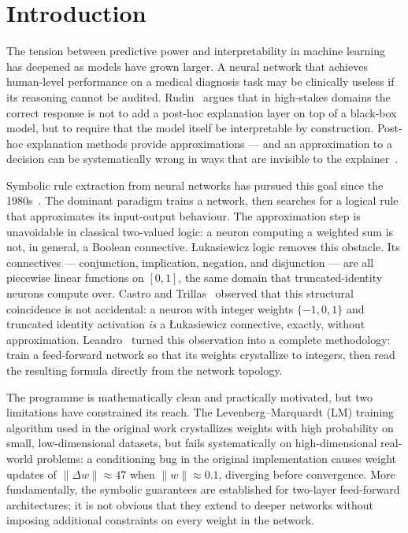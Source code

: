 \documentclass[12pt,a4paper]{article}
\begin{document}
\section{Introduction}
\label{sec:intro}

The tension between predictive power and interpretability in machine learning
has deepened as models have grown larger.
A neural network that achieves human-level performance on a medical diagnosis
task may be clinically useless if its reasoning cannot be audited.
Rudin~\cite{rudin2019} argues that in high-stakes domains the correct response
is not to add a post-hoc explanation layer on top of a black-box model, but to
require that the model itself be interpretable by construction.
Post-hoc explanation methods provide approximations --- and an approximation
to a decision can be systematically wrong in ways that are invisible to the
explainer~\cite{guidotti2018}.

Symbolic rule extraction from neural networks has pursued this goal since the
1980s~\cite{gallant1988,towell1993,towell1994}.
The dominant paradigm trains a network, then searches for a logical rule that
approximates its input-output behaviour.
The approximation step is unavoidable in classical two-valued logic: a neuron
computing a weighted sum is not, in general, a Boolean connective.
\L{}ukasiewicz logic removes this obstacle.
Its connectives --- conjunction, implication, negation, and disjunction ---
are all piecewise linear functions on $[0,1]$, the same domain that
truncated-identity neurons compute over.
Castro and Trillas~\cite{castro1998} observed that this structural coincidence
is not accidental: a neuron with integer weights $\{-1,0,1\}$ and truncated
identity activation \emph{is} a \L{}ukasiewicz connective, exactly, without
approximation.
Leandro~\cite{leandro2009} turned this observation into a complete
methodology: train a feed-forward network so that its weights crystallize to
integers, then read the resulting formula directly from the network topology.

The programme is mathematically clean and practically motivated, but two
limitations have constrained its reach.
The Levenberg--Marquardt (LM) training algorithm used in the original work
crystallizes weights with high probability on small, low-dimensional datasets,
but fails systematically on high-dimensional real-world problems: a
conditioning bug in the original implementation causes weight updates of
$\|\Delta w\| \approx 47$ when $\|w\| \approx 0.1$, diverging before
convergence.
More fundamentally, the symbolic guarantees are established for two-layer
feed-forward architectures; it is not obvious that they extend to deeper
networks without imposing additional constraints on every weight in the network.
\end{document}
